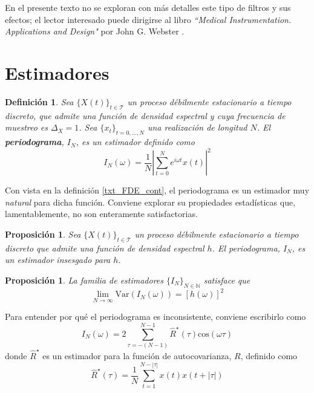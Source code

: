 \documentclass[12pt,letterpaper]{book}
\newtheorem{definicion}{Definición}[chapter]
\newtheorem{proposicion}[teorema]{Proposición}
\newcommand{\N}{\mathbb{N}}
\newcommand{\COS}[1]{\mathrm{cos}\left( #1 \right)}
\newcommand{\Var}[1]{\mathrm{Var}\left( #1 \right)}
\newcommand{\abso}[1]{\left| #1 \right|}
\newcommand{\xt}{$\{X(t)\}_{t\in \mathcal{T}}$ }
\newcommand{\xtd}{$\{x_t\}_{t=0,\dots,N}$ }
\begin{document}
En el presente texto no se exploran con más detalles este tipo de filtros y sus efectos; el lector interesado puede dirigirse al libro \textit{``Medical {I}nstrumentation. {A}pplications and {D}esign"} por John G. Webster \cite{Webster}.


\section{Estimadores}
\label{sec:estimadores}

\begin{definicion}
Sea \xt un proceso débilmente estacionario a tiempo discreto, que admite una función de densidad espectral y cuya frecuencia de muestreo es $\Delta_X=1$. Sea \xtd una realización de longitud $N$. 
%
El \textbf{periodograma}, $I_N$, es un estimador definido como
\begin{equation}
I_N(\omega) = \frac{1}{N} \abso{\sum_{t = 0}^{N} e^{i \omega t} x(t)}^{2}
\end{equation}
\label{txt_periodograma}
\end{definicion}

Con vista en la definición \ref{txt_FDE_cont}, el periodograma es un estimador muy \textit{natural} para dicha función.
%
Conviene explorar su propiedades estadísticas que, lamentablemente, no son enteramente satisfactorias.

\begin{proposicion}
Sea \xt un proceso débilmente estacionario a tiempo discreto que admite una función de densidad espectral $h$.
%
El periodograma, $I_N$, es un estimador insesgado para $h$.
\end{proposicion}

\begin{proposicion}
La familia de estimadores $\{I_N\}_{N\in\N}$ satisface que
\begin{equation}
\lim_{N\rightarrow \infty} \Var{I_N(\omega)} = \left[ h(\omega) \right]^{2}
\end{equation}
\label{lazy-algo}
\end{proposicion}

Para entender por qué el periodograma es inconsistente, conviene escribirlo como
\begin{equation}
I_N(\omega) = 2 \sum_{\tau = -(N-1)}^{N-1} \widehat{R}^{\star}(\tau) \COS{\omega \tau}
\label{txt_periodograma2}
\end{equation}
%
donde $\widehat{R}^{\star}$ es un estimador para la función de autocovarianza, $R$, definido como
\begin{equation}
\widehat{R}^{\star} (\tau) = \frac{1}{N} \sum_{t = 1}^{N-\abso{\tau}} x(t) x(t+\abso{\tau})
\end{equation}
\end{document}
